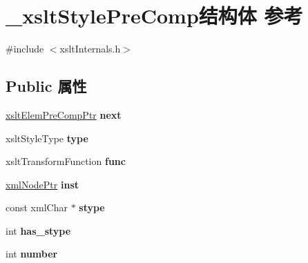 \hypertarget{struct__xslt_style_pre_comp}{}\section{\+\_\+xslt\+Style\+Pre\+Comp结构体 参考}
\label{struct__xslt_style_pre_comp}


{\ttfamily \#include $<$xslt\+Internals.\+h$>$}

\subsection*{Public 属性}
\begin{DoxyCompactItemize}
\item 
\mbox{\label{struct__xslt_style_pre_comp_a960a04fde0311ae8c819635b796e0e6b}} 
\hyperlink{struct__xslt_elem_pre_comp}{xslt\+Elem\+Pre\+Comp\+Ptr} {\bfseries next}
\item 
\mbox{\label{struct__xslt_style_pre_comp_a4067054d71d8cd96b0cbe337dd7afbbd}} 
xslt\+Style\+Type {\bfseries type}
\item 
\mbox{\label{struct__xslt_style_pre_comp_a972712678a2c512d5e16908205b631c2}} 
xslt\+Transform\+Function {\bfseries func}
\item 
\mbox{\label{struct__xslt_style_pre_comp_a9c2b45aa6bd442bfca5b65cc47dc579e}} 
\hyperlink{struct__xml_node}{xml\+Node\+Ptr} {\bfseries inst}
\item 
\mbox{\label{struct__xslt_style_pre_comp_a5a7e8a929ccb3d42dc9cc2f6d96c9ae6}} 
const xml\+Char $\ast$ {\bfseries stype}
\item 
\mbox{\label{struct__xslt_style_pre_comp_a3450c262274b46c754f747598f0edd64}} 
int {\bfseries has\+\_\+stype}
\item 
\mbox{\label{struct__xslt_style_pre_comp_a975af80dd0c756486235fc0135f0e325}} 
int {\bfseries number}
\item 
\mbox{\label{struct__xslt_style_pre_comp_a54785b79b07cf925159d00bd608b8d7d}} 

\end{DoxyCompactItemize}
